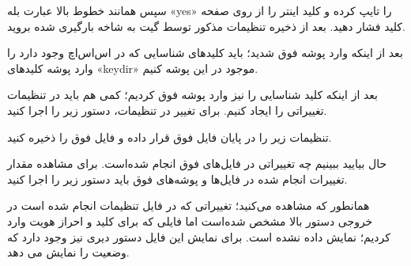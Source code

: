 سپس همانند خطوط بالا عبارت بله «yes» را تایپ کرده و کلید اینتر را از روی صفحه کلید فشار دهید. بعد از ذخیره تنظیمات مذکور توسط گیت به شاخه بارگیری شده بروید.
\newline

\begin{latin}  
    
\end{latin}

بعد از اینکه وارد پوشه فوق شدید؛ باید کلیدهای شناسایی که در  اس‌اس‌اچ وجود دارد را وارد پوشه کلید‌های «keydir»  موجود در این پوشه کنیم.
\newline

\begin{latin}  
    
\end{latin}

بعد از اینکه کلید شناسایی را نیز وارد پوشه فوق کردیم؛ کمی هم باید در تنظیمات تغییراتی را ایجاد کنیم. برای تغییر در تنظیمات، دستور زیر را اجرا کنید.
\newline

\begin{latin}  
    
\end{latin}
تنظیمات زیر را در پایان فایل فوق قرار داده و فایل فوق را ذخیره کنید.
\newline

\begin{latin}  
    
\end{latin}

حال بیایید ببینیم چه تغییراتی در فایل‌های فوق انجام شده‌است. برای مشاهده مقدار تغییرات انجام شده در فایل‌ها و پوشه‌های فوق باید دستور زیر را اجرا کنید.
\newline

\begin{latin}  
    
\end{latin}

همانطور که مشاهده می‌کنید؛ تغییراتی که در فایل تنظیمات انجام شده است در خروجی دستور بالا مشخص شده‌است اما فایلی که برای کلید و احراز هویت وارد کردیم؛ نمایش داده نشده است. برای نمایش این فایل دستور دیری نیز وجود دارد که وضعیت را نمایش می دهد.
\newline

